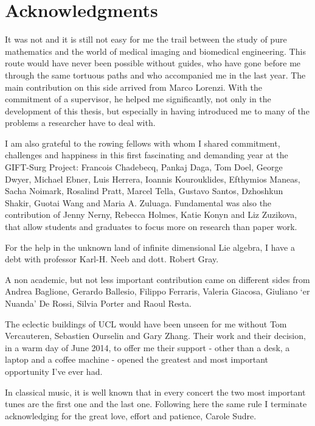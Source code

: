 \section*{Acknowledgments}

It was not and it is still not easy for me the trail between the study of pure mathematics and the world of medical imaging and biomedical engineering. This route would have never been possible without guides, who have gone before me through the same tortuous paths and who accompanied me in the last year. The main contribution on this side arrived from Marco Lorenzi. With the commitment of a supervisor, he helped me significantly, not only in the development of this thesis, but especially in having introduced me to many of the problems a researcher have to deal with.

I am also grateful to the rowing fellows with whom I shared commitment, challenges and happiness in this first fascinating and demanding year at the GIFT-Surg Project: 
Francois Chadebecq, 
Pankaj Daga, 
Tom Doel, 
George Dwyer,
Michael Ebner,
Luis Herrera,
Ioannis Kourouklides,
Efthymios Maneas,
Sacha Noimark,
Rosalind Pratt,
Marcel Tella,
Gustavo Santos,
Dzhoshkun Shakir,
Guotai Wang and Maria A. Zuluaga.
Fundamental was also the contribution of Jenny Nerny, Rebecca Holmes, Katie Konyn and Liz Zuzikova, that allow students and graduates to focus more on research than paper work.

For the help in the unknown land of infinite dimensional Lie algebra, I have a debt with professor Karl-H. Neeb and dott. Robert Gray.

A non academic, but not less important contribution came on different sides from Andrea Baglione, Gerardo Ballesio, Filippo Ferraris, Valeria Giacosa, Giuliano `er Nuanda' De Rossi, Silvia Porter and Raoul Resta. 

The eclectic buildings of UCL would have been unseen for me without Tom Vercauteren, Sebastien Ourselin and Gary Zhang. Their work and their decision, in a warm day of June 2014, to offer me their support - other than a desk, a laptop and a coffee machine - opened the greatest and most important opportunity I've ever had.
 
In classical music, it is well known that in every concert the two most important tunes are the first one and the last one. Following here the same rule I terminate acknowledging for the great love, effort and patience, Carole Sudre.



\qquad
\pagestyle{empty}
\newpage



\qquad
\pagestyle{empty}
\newpage
